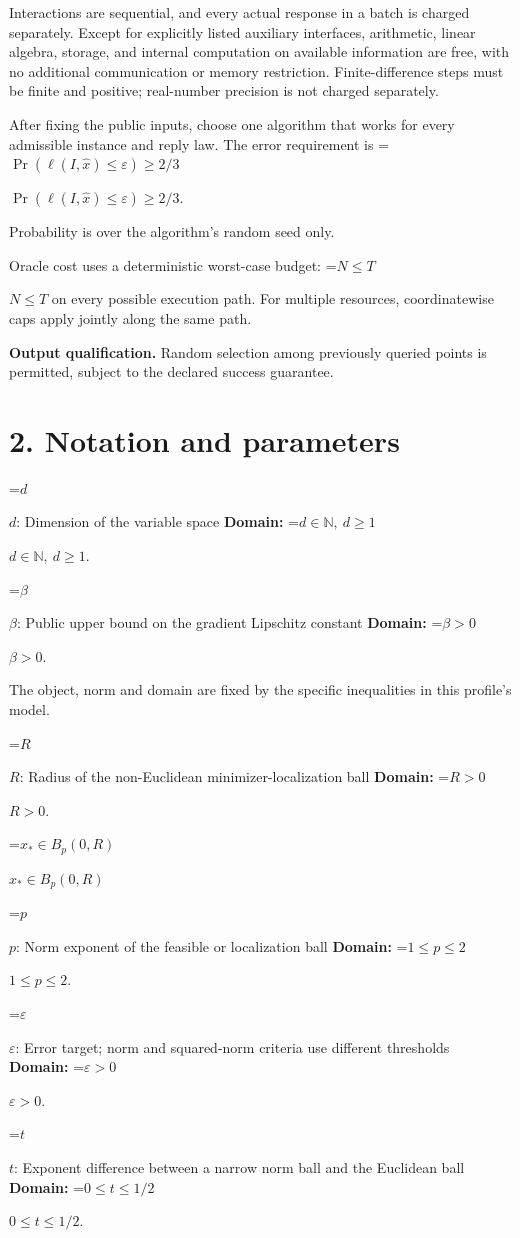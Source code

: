 \documentclass[10pt,a4paper]{article}
\newcommand{\AtlasMath}[1]{\par\begingroup\centering\setbox0=\hbox{$\displaystyle #1$}\ifdim\wd0>1.4\linewidth\typeout{ATLAS WIDE FORMULA: \the\wd0}\fi\ifdim\wd0>\linewidth\resizebox{\linewidth}{!}{\box0}\else\box0\fi\par\endgroup}
\newcommand{\AtlasInlineMath}[1]{\begingroup\setbox0=\hbox{$#1$}\ifdim\wd0>.4\linewidth\endgroup\AtlasMath{#1}\else\endgroup$#1$\fi}
\begin{document}
Interactions are sequential, and every actual response in a batch is charged separately. Except for explicitly listed auxiliary interfaces, arithmetic, linear algebra, storage, and internal computation on available information are free, with no additional communication or memory restriction. Finite-difference steps must be finite and positive; real-number precision is not charged separately.

After fixing the public inputs, choose one algorithm that works for every admissible instance and reply law. The error requirement is \AtlasInlineMath{\Pr(\ell(I,\widehat{x})\le \varepsilon)\ge2/3}.

Probability is over the algorithm's random seed only.

Oracle cost uses a deterministic worst-case budget: \AtlasInlineMath{N\le T} on every possible execution path. For multiple resources, coordinatewise caps apply jointly along the same path.

\textbf{Output qualification.} Random selection among previously queried points is permitted, subject to the declared success guarantee.

\section{2. Notation and parameters}
\AtlasInlineMath{d}: Dimension of the variable space \textbf{Domain:} \AtlasInlineMath{d\in\mathbb{N},\ d\ge1}.

\AtlasInlineMath{\beta}: Public upper bound on the gradient Lipschitz constant \textbf{Domain:} \AtlasInlineMath{\beta>0}.

The object, norm and domain are fixed by the specific inequalities in this profile's model.

\AtlasInlineMath{R}: Radius of the non-Euclidean minimizer-localization ball \textbf{Domain:} \AtlasInlineMath{R>0}.

\AtlasInlineMath{x_*\in B_p(0,R)}

\AtlasInlineMath{p}: Norm exponent of the feasible or localization ball \textbf{Domain:} \AtlasInlineMath{1\le p\le2}.

\AtlasInlineMath{\varepsilon}: Error target; norm and squared-norm criteria use different thresholds \textbf{Domain:} \AtlasInlineMath{\varepsilon>0}.

\AtlasInlineMath{t}: Exponent difference between a narrow norm ball and the Euclidean ball \textbf{Domain:} \AtlasInlineMath{0\le t\le1/2}.
\end{document}

